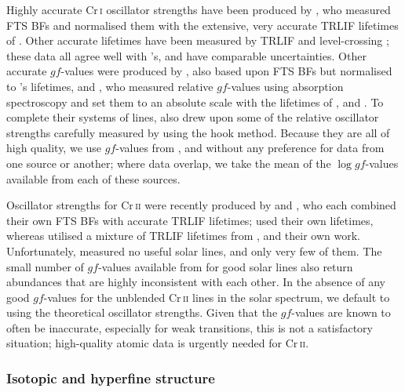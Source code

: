 \documentclass[traditabstract]{aa}
\begin{document}
Highly accurate Cr\,\textsc{i} oscillator strengths have been produced by \citet{Sobeck07}, who measured FTS BFs and normalised them with the extensive, very accurate TRLIF lifetimes of \citet{Cooper97}.  Other accurate lifetimes have been measured by TRLIF \citep{Hannaford81, Kwiatkowski81, Kwong80, Measures77} and level-crossing \citep{Becker77}; these data all agree well with \citeauthor{Cooper97}'s, and have comparable uncertainties. Other accurate $gf$-values were produced by \citet{Tozzi85}, also based upon FTS BFs but normalised to \citeauthor{Kwiatkowski81}'s lifetimes, and \citet{Blackwell84, Blackwell86}, who measured relative $gf$-values using absorption spectroscopy and set them to an absolute scale with the lifetimes of \citet{Hannaford81}, \citet{Kwiatkowski81} and \citet{Becker77}.  To complete their systems of lines, \citeauthor{Blackwell84} also drew upon some of the relative oscillator strengths carefully measured by \citet{Huber77} using the hook method.  Because they are all of high quality, we use $gf$-values from \citet{Sobeck07}, \citet{Blackwell84, Blackwell86} and \citet{Tozzi85} without any preference for data from one source or another; where data overlap, we take the mean of the $\log gf$-values available from each of these sources.

Oscillator strengths for Cr\,\textsc{ii} were recently produced by \citet{Gurell10} and \citet{Nilsson06}, who each combined their own FTS BFs with accurate TRLIF lifetimes; \citet{Gurell10} used their own lifetimes, whereas \citeauthor{Nilsson06} utilised a mixture of TRLIF lifetimes from \citet{Schade90}, \citet{Bergeson93b} and their own work.  Unfortunately, \citet{Gurell10} measured no useful solar lines, and \citeauthor{Nilsson06} only very few of them.  The small number of $gf$-values available from \citeauthor{Nilsson06} for good solar lines also return abundances that are highly inconsistent with each other.  In the absence of any good $gf$-values for the unblended Cr\,\textsc{ii} lines in the solar spectrum, we default to using the theoretical \citet{Kuruczweb} oscillator strengths.  Given that the \citeauthor{Kuruczweb} $gf$-values are known to often be inaccurate, especially for weak transitions, this is not a satisfactory situation; high-quality atomic data is urgently needed for Cr\,\textsc{ii}.

\subsubsection{Isotopic and hyperfine structure}
\label{Crhfs}
\end{document}
